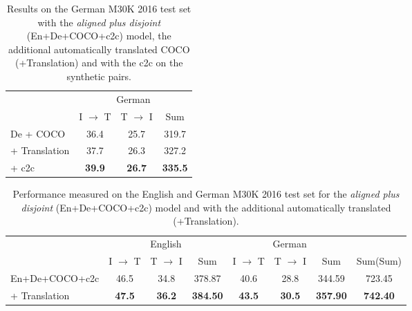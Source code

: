 \begin{table}[t]
    \centering
    \renewcommand{\arraystretch}{1.0}
    \begin{tabular}{lccc}
        \toprule
         & \multicolumn{3}{c}{German}\\
         & I $\rightarrow$ T & T $\rightarrow$ I & Sum\\
         \midrule
         De + COCO & 36.4 & 25.7 & 319.7\\
         \: \: + Translation & 37.7 & 26.3 & 327.2\\
         \: \: \: + c2c      & {\bf 39.9} & {\bf 26.7} & {\bf 335.5}\\
         \bottomrule
    \end{tabular}
    \caption{Results on the German
    M30K 2016 test set with the \emph{aligned plus disjoint} 
    (En+De+COCO+c2c) model, the additional automatically translated COCO (+Translation) and with the c2c on the synthetic pairs.
    }
    \label{tab:german_translation_disjoint}
\end{table}

\begin{table*}[ht]
    \centering
    \renewcommand{\arraystretch}{1.0}
    \begin{tabular}{lccccccc}
        \toprule
         & \multicolumn{3}{c}{English} & \multicolumn{3}{c}{German}\\
         \cmidrule(lr){2-4} \cmidrule(lr){5-7}
         & I $\rightarrow$ T & T $\rightarrow$ I & Sum  & I $\rightarrow$ T & T $\rightarrow$ I & Sum & Sum(Sum)\\
         \midrule
         En+De+COCO+c2c & 46.5 & 34.8 & 378.87 & 40.6 & 28.8 & 344.59 & 723.45 \\
         \: + Translation & \textbf{47.5} & \textbf{36.2} & \textbf{384.50} & \textbf{43.5} & \textbf{30.5} & \textbf{357.90} & \textbf{742.40}\\
         \bottomrule
    \end{tabular}
    \caption{Performance measured on the English and German
    M30K 2016 test set for the \emph{aligned plus disjoint} (En+De+COCO+c2c) model and with the additional automatically translated (+Translation).}
    \label{tab:translation_alignedplusdisjoint}
\end{table*}

